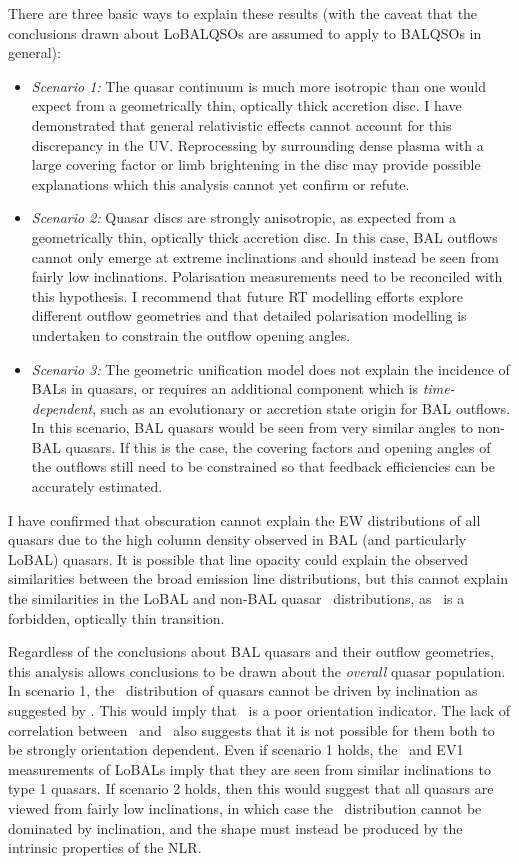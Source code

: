 There are three basic ways to explain these results (with the caveat that the conclusions
drawn about LoBALQSOs are assumed to apply to BALQSOs in general):
\begin{itemize}
	\item {\sl Scenario 1:} The quasar continuum is much more isotropic than one would
	expect from a geometrically thin, optically thick accretion disc.
    I have demonstrated that general relativistic effects cannot account for this discrepancy in the 
    UV. Reprocessing by surrounding dense plasma with a large covering factor or limb brightening 
    in the disc may provide possible explanations which this analysis cannot yet confirm or refute.
    \smallskip
	\item {\sl Scenario 2:} Quasar discs are strongly anisotropic, as expected from a 
	geometrically thin, optically thick accretion disc. In this case, BAL outflows cannot 
	only emerge at extreme inclinations and should instead be seen from fairly low inclinations. 
	Polarisation measurements need to be reconciled with this hypothesis.
	I recommend that future RT modelling efforts explore different outflow 
	geometries and that detailed polarisation modelling is undertaken to constrain the 
	outflow opening angles.
	\smallskip
	\item  {\sl Scenario 3:} The geometric unification model does not explain the incidence of 
	BALs in quasars, or requires an additional component which is {\em time-dependent}, 
	such as an evolutionary or accretion state origin for BAL outflows. In this scenario, 
	BAL quasars would be seen from very similar angles to non-BAL quasars. If this is the case,
	the covering factors and opening angles of the outflows still need to be constrained so
	that feedback efficiencies can be accurately estimated.
\end{itemize}
I have confirmed that obscuration cannot explain the EW distributions of all quasars
due to the high column density observed in BAL (and particularly LoBAL) quasars. It is
possible that line opacity could explain the observed similarities between the broad emission
line distributions, but this cannot explain the similarities in the LoBAL and non-BAL
quasar \ewo\ distributions, as \oiii\ is a forbidden, optically thin transition.

Regardless of the conclusions about BAL quasars and their outflow geometries,
this analysis allows conclusions to be drawn about the {\em overall} 
quasar population. In scenario 1, the \ewo\ distribution of quasars cannot
be driven by inclination as suggested by \citep{risaliti2011}. This would
imply that \ewo\ is a poor orientation indicator. The lack of correlation 
between \ewo\ and \fwh\ also suggests that it is not possible for them both
to be strongly orientation dependent. Even if scenario 1 holds, the \fwh\ and EV1
measurements of LoBALs imply that they are seen from similar inclinations to type 1 quasars. 
If scenario 2 holds, then this would suggest that all quasars are viewed from fairly low inclinations,
in which case the \ewo\ distribution cannot be dominated by inclination, and the shape must instead
be produced by the intrinsic properties of the NLR.

